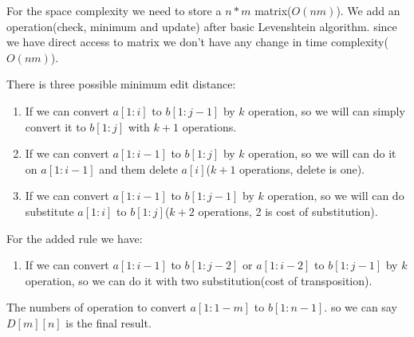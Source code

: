 \documentclass[paper=a4, fontsize=11pt]{scrartcl} %
\numberwithin{equation}{section} %
\numberwithin{figure}{section} %
\numberwithin{table}{section} %
\begin{document}
\begin{flushleft}
For the space complexity we need to store a $n*m$ matrix($O(nm)$). We add an operation(check, minimum and update) after basic Levenshtein algorithm. since we have direct access to matrix we don't have any change in time complexity($O(nm)$).

\end{flushleft}
\begin{flushleft}
There is three possible minimum edit distance:
\begin{enumerate}
\item If we can convert $a[1:i]$ to $b[1:j-1]$ by $k$ operation, so we will can simply convert it to $b[1:j]$ with $k + 1$ operations.
\item If we can convert $a[1:i-1]$ to $b[1:j]$ by $k$ operation, so we will can do it on $a[1:i-1]$ and them delete $a[i]$($k+1$ operations, delete is one).
\item If we can convert $a[1:i-1]$ to $b[1:j-1]$ by $k$ operation, so we will can do substitute $a[1:i]$ to $b[1:j]$($k+2$ operations, 2 is cost of substitution).
\end{enumerate}
For the added rule we have:
\begin{enumerate}
\item If we can convert $a[1:i-1]$ to $b[1:j-2]$ or $a[1:i-2]$ to $b[1:j-1]$ by $k$ operation, so we can do it with two substitution(cost of transposition).
\end{enumerate}
\end{flushleft}
\begin{flushleft}

The numbers of operation to convert $a[1:1-m]$ to $b[1:n-1]$. so we can say $D[m][n]$ is the final result.
\end{flushleft}
\end{document}
